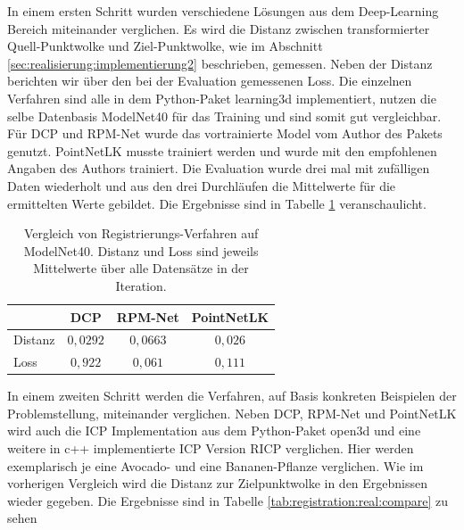 \documentclass[12pt,titlepage, twoside]{article}
\begin{document}
In einem ersten Schritt wurden verschiedene Lösungen aus dem Deep-Learning Bereich miteinander verglichen. 
Es wird die Distanz zwischen transformierter Quell-Punktwolke und Ziel-Punktwolke, wie im Abschnitt \ref{sec:realisierung:implementierung2} beschrieben, gemessen. 
Neben der Distanz berichten wir über den bei der Evaluation gemessenen Loss.
Die einzelnen Verfahren sind alle in dem Python-Paket learning3d \cite{learning3d} implementiert, nutzen die selbe Datenbasis ModelNet40 für das Training und sind somit gut vergleichbar. 
Für DCP und RPM-Net wurde das vortrainierte Model vom Author des Pakets genutzt.
PointNetLK musste trainiert werden und wurde mit den empfohlenen Angaben des Authors trainiert. 
Die Evaluation wurde drei mal mit zufälligen Daten wiederholt und aus den drei Durchläufen die Mittelwerte für die ermittelten Werte gebildet.
Die Ergebnisse sind in Tabelle \ref{tab:registration:deeplearn:compare} veranschaulicht.

\begin{table}
\begin{center}
\begin{tabular}{|l || c | c | c | } 
    \hline
     & DCP & RPM-Net & PointNetLK \\  
    \hline
    \hline
    Distanz & $0,0292$ & $0,0663$& $0,026$\\
    \hline
    Loss & $0,922$& $0,061$& $0,111$\\
    \hline
\end{tabular}
\end{center}
\caption{Vergleich von Registrierungs-Verfahren auf ModelNet40. Distanz und Loss sind jeweils Mittelwerte über alle Datensätze in der Iteration.}
\label{tab:registration:deeplearn:compare}
\end{table}

In einem zweiten Schritt werden die Verfahren, auf Basis konkreten Beispielen der Problemstellung, miteinander verglichen. 
Neben DCP, RPM-Net und PointNetLK wird auch die ICP Implementation aus dem Python-Paket open3d \cite{zhou2018open3d} und eine weitere in c++ implementierte ICP Version RICP verglichen.
Hier werden exemplarisch je eine Avocado- und eine Bananen-Pflanze verglichen. Wie im vorherigen Vergleich wird die Distanz zur Zielpunktwolke in den Ergebnissen wieder gegeben.
Die Ergebnisse sind in Tabelle \ref{tab:registration:real:compare} zu sehen
\end{document}
